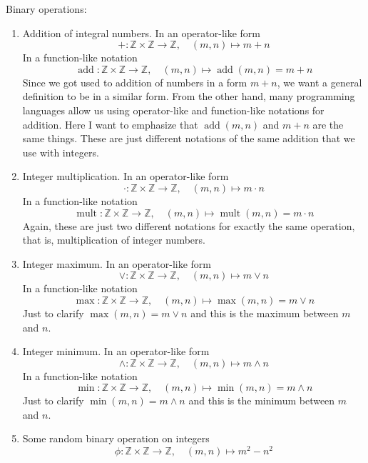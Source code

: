 \begin{examples}
Binary operations:
\begin{enumerate}
\item Addition of integral numbers.
In an operator-like form
\[
+\colon \mathbb Z\times \mathbb Z\to \mathbb Z,\quad (m,n) \mapsto m + n
\]
In a function-like notation
\[
\operatorname{add}\colon \mathbb Z\times \mathbb Z\to \mathbb Z,\quad (m,n) \mapsto \operatorname{add}(m,n) = m+n
\]
Since we got used to addition of numbers in a form $m + n$, we want a general definition to be in a similar form.
From the other hand, many programming languages allow us using operator-like and function-like notations for addition.
Here I want to emphasize that $\operatorname{add}(m,n)$ and $m+n$ are the same things.
These are just different notations of the same addition that we use with integers.

\item Integer multiplication.
In an operator-like form
\[
\cdot\colon \mathbb Z\times \mathbb Z\to \mathbb Z,\quad (m,n) \mapsto m \cdot n
\]
In a function-like notation
\[
\operatorname{mult}\colon \mathbb Z\times \mathbb Z\to \mathbb Z,\quad (m,n) \mapsto \operatorname{mult}(m,n) = m\cdot n
\]
Again, these are just two different notations for exactly the same operation, that is, multiplication of integer numbers.

\item Integer maximum.
In an operator-like form
\[
\vee\colon \mathbb Z\times \mathbb Z\to \mathbb Z,\quad (m,n) \mapsto m \vee n
\]
In a function-like notation
\[
\operatorname{max}\colon \mathbb Z\times \mathbb Z\to \mathbb Z,\quad (m,n) \mapsto \operatorname{max}(m,n) = m\vee n
\]
Just to clarify $\max(m,n) =m \vee n$ and this is the maximum between $m$ and $n$.

\item Integer minimum.
In an operator-like form
\[
\wedge\colon \mathbb Z\times \mathbb Z\to \mathbb Z,\quad (m,n) \mapsto m \wedge n
\]
In a function-like notation
\[
\operatorname{min}\colon \mathbb Z\times \mathbb Z\to \mathbb Z,\quad (m,n) \mapsto \operatorname{min}(m,n) = m\wedge n
\]
Just to clarify $\min(m,n) =m \wedge n$ and this is the minimum between $m$ and $n$.

\item Some random binary operation on integers
\[
\phi\colon \mathbb Z\times \mathbb Z\to \mathbb Z,\quad (m,n)\mapsto m^2 - n^2
\]
\end{enumerate}
\end{examples}

